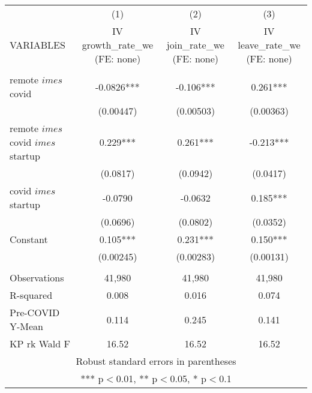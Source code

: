 \documentclass[]{article}
\begin{document}
\begin{tabular}{lccc} \hline
 & (1) & (2) & (3) \\
VARIABLES & IV growth\_rate\_we (FE: none) & IV join\_rate\_we (FE: none) & IV leave\_rate\_we (FE: none) \\ \hline
 &  &  &  \\
remote $	imes$ covid & -0.0826*** & -0.106*** & 0.261*** \\
 & (0.00447) & (0.00503) & (0.00363) \\
remote $	imes$ covid $	imes$ startup & 0.229*** & 0.261*** & -0.213*** \\
 & (0.0817) & (0.0942) & (0.0417) \\
covid $	imes$ startup & -0.0790 & -0.0632 & 0.185*** \\
 & (0.0696) & (0.0802) & (0.0352) \\
Constant & 0.105*** & 0.231*** & 0.150*** \\
 & (0.00245) & (0.00283) & (0.00131) \\
 &  &  &  \\
Observations & 41,980 & 41,980 & 41,980 \\
R-squared & 0.008 & 0.016 & 0.074 \\
Pre-COVID Y-Mean & 0.114 & 0.245 & 0.141 \\
 KP rk Wald F & 16.52 & 16.52 & 16.52 \\ \hline
\multicolumn{4}{c}{ Robust standard errors in parentheses} \\
\multicolumn{4}{c}{ *** p$<$0.01, ** p$<$0.05, * p$<$0.1} \\
\end{tabular}
\end{document}
